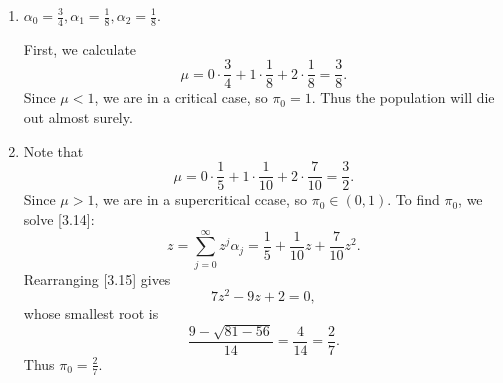 \documentclass[stat333]{subfiles}
\begin{document}
    \begin{enumerate}
        \item $\alpha_0=\frac{3}{4},\alpha_1=\frac{1}{8},\alpha_2=\frac{1}{8}$.
           
            \begin{subproof}[Answer]
                First, we calculate
                \begin{equation*}
                    \mu = 0\cdot \frac{3}{4} + 1\cdot \frac{1}{8} + 2\cdot \frac{1}{8} = \frac{3}{8}.
                \end{equation*}
                Since $\mu<1$, we are in a critical case, so $\pi_0=1$. Thus the population will die out almost surely.
            \end{subproof}

        \item 

            \begin{subproof}[Answer]
                Note that
                \begin{equation*}
                    \mu = 0\cdot \frac{1}{5} + 1\cdot \frac{1}{10} + 2\cdot \frac{7}{10} = \frac{3}{2}.
                \end{equation*}
                Since $\mu>1$, we are in a supercritical ccase, so $\pi_0\in\left( 0,1 \right)$. To find $\pi_0$, we solve [3.14]:
                \begin{equation}
                    z = \sum^{\infty}_{j=0} z^j\alpha_j = \frac{1}{5} + \frac{1}{10}z + \frac{7}{10}z^{2}.
                \end{equation}
                Rearranging [3.15] gives
                \begin{equation*}
                    7z^{2}-9z+2=0,
                \end{equation*}
                whose smallest root is
                \begin{equation*}
                    \frac{9-\sqrt{81-56}}{14} = \frac{4}{14} = \frac{2}{7}.
                \end{equation*}
                Thus $\pi_0 = \frac{2}{7}$.
            \end{subproof}
    \end{enumerate}
\end{document}
